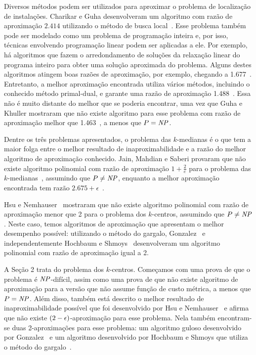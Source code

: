 \documentclass[12pt]{article}
\begin{document}
Diversos métodos podem ser utilizados para aproximar o problema de localização de instalações. Charikar e Guha desenvolveram um algoritmo com razão de aproximação $2.414$ utilizando o método de busca local~\cite{Charikar&Guha'05}.  Esse problema também pode ser modelado como um problema de programação inteira e, por isso, técnicas envolvendo programação linear podem ser aplicadas a ele.  Por exemplo, há algoritmos que fazem o arredondamento de soluções da relaxação linear do programa inteiro para obter uma solução aproximada do problema.  Alguns destes algoritmos atingem boas razões de aproximação, por exemplo, chegando a 1.677~\cite{Byrka&Aardal'10}. Entretanto, a melhor aproximação encontrada utiliza vários métodos, incluindo o conhecido método primal-dual, e garante uma razão de aproximação 1.488~\cite{LI'13}. Essa não é muito distante do melhor que se poderia encontrar, uma vez que Guha e Khuller mostraram que não existe algoritmo para esse problema com razão de aproximação melhor que 1.463~\cite{GUHA1999228}, a menos que $P = \mathit{NP}$.


Dentre os três problemas apresentados, o problema das $k$-medianas é o que tem a maior folga entre o melhor resultado de inaproximabilidade e a razão do melhor algoritmo de aproximação conhecido. Jain, Mahdian e Saberi provaram que não existe algoritmo polinomial com razão de aproximação $1+ \frac{2}{e}$ para o problema das $k$-medianas~\cite{JMS'02}, assumindo que $P \neq \mathit{NP}$, enquanto a melhor aproximação encontrada tem razão $2.675 + \epsilon$~\cite{BPRST'17}.


Hsu e Nemhauser~\cite{HSU1979209} mostraram que não existe algoritmo polinomial com razão de aproximação menor que 2 para o problema dos $k$-centros, assumindo que $P\neq\mathit{NP}$. Neste caso, temos algoritmos de aproximação que apresentam o melhor desempenho possível: utilizando o método do gargalo, Gonzalez~\cite{GONZALEZ1985293} e independentemente Hochbaum e Shmoys~\cite{HochShmoys'85} desenvolveram um algoritmo polinomial com razão de aproximação igual a 2.

A Seção 2 trata do problema dos $k$-centros. Começamos com uma prova de que o problema é $\mathit{NP}$-difícil, assim como uma prova de que não existe algoritmo de aproximação para a versão que não assume função de custo métrica, a menos que $P = \mathit{NP}$. Além disso, também está descrito o melhor resultado de inaproximabilidade possível que foi desenvolvido por Hsu e Nemhauser~\cite{HSU1979209} e afirma que não existe $(2-\epsilon)$-aproximação para esse problema. Nela também encontram-se duas 2-aproximações para esse problema: um algoritmo guloso desenvolvido por Gonzalez~\cite{GONZALEZ1985293} e um algoritmo desenvolvido por Hochbaum e Shmoys que utiliza o método do gargalo~\cite{HSBottle}.
\end{document}

